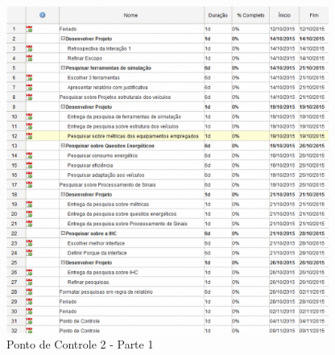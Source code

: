 \begin{apendicesenv}
\begin{figure}[h]
  \centering
  \includegraphics[width=400px, scale=1]{figuras/2cronograma}
  \caption{Ponto de Controle 2 - Parte 1}
\label{fig:2cronograma}
\end{figure}




\end{apendicesenv}
